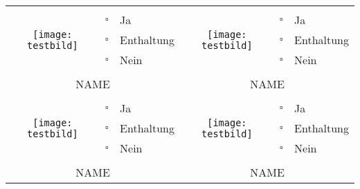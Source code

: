 \documentclass[a4paper,10pt]{scrartcl}
\begin{document}
\begin{center}
\begin{tabularx}{0.95\textwidth}{|clX||clX|}
  \hline\hline
  
    \multirow{5}{*}{\texttt{[image: testbild]}} &  & & \multirow{5}{*}{\texttt{[image: testbild]}} & & \\
    &  $\square$ & Ja &  &$\square$ & Ja \\
    &  $\square$ & Enthaltung &  &$\square$ & Enthaltung \\
    & $\square$ & Nein\hspace{2cm} & & $\square$ & Nein\\
    &&&&&\\
  \multicolumn{3}{|c||}{NAME} & \multicolumn{3}{|c|}{NAME} \\

  \hline\hline
  
      \multirow{5}{*}{\texttt{[image: testbild]}} &  & & \multirow{5}{*}{\texttt{[image: testbild]}} & & \\
    &  $\square$ & Ja &  &$\square$ & Ja \\
    &  $\square$ & Enthaltung &  &$\square$ & Enthaltung \\
    & $\square$ & Nein\hspace{2cm} & & $\square$ & Nein\\
    &&&&&\\
  \multicolumn{3}{|c||}{NAME} & \multicolumn{3}{|c|}{NAME} \\

  \hline
\end{tabularx}
\end{center}
\end{document}
